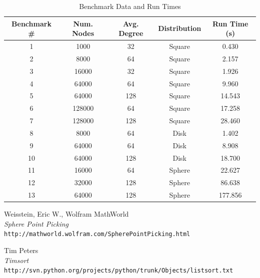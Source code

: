 \documentclass{article}
\begin{document}
        \begin{center}
            \begin{table}
                \centering
                \begin{tabular}{|c|c|c|c|c|}
                    \hline
                    Benchmark \# & Num. Nodes & Avg. Degree & Distribution & Run Time (s)\\
                    \hline
                    1 & 1000 & 32 & Square & 0.430 \\
                    2 & 8000 & 64 & Square & 2.157 \\
                    3 & 16000 & 32 & Square & 1.926 \\
                    4 & 64000 & 64 & Square & 9.960 \\
                    5 & 64000 & 128 & Square & 14.543 \\
                    6 & 128000 & 64 & Square & 17.258 \\
                    7 & 128000 & 128 & Square & 28.460 \\
                    8 & 8000 & 64 & Disk & 1.402 \\
                    9 & 64000 & 64 & Disk & 8.908 \\
                    10 & 64000 & 128 & Disk & 18.700 \\
                    11 & 16000 & 64 & Sphere & 22.627 \\
                    12 & 32000 & 128 & Sphere & 86.638 \\
                    13 & 64000 & 128 & Sphere & 177.856 \\
                    \hline
                \end{tabular}
                \caption{Benchmark Data and Run Times}
                \label{tab1}
            \end{table}
        \end{center}


\newpage

\begin{thebibliography}{10}
    Weisstein, Eric W., Wolfram MathWorld \\
    \textit{Sphere Point Picking} \\
    \texttt{http://mathworld.wolfram.com/SpherePointPicking.html}

    Tim Peters \\
    \textit{Timsort} \\
    \texttt{http://svn.python.org/projects/python/trunk/Objects/listsort.txt}

\end{thebibliography}
\end{document}
